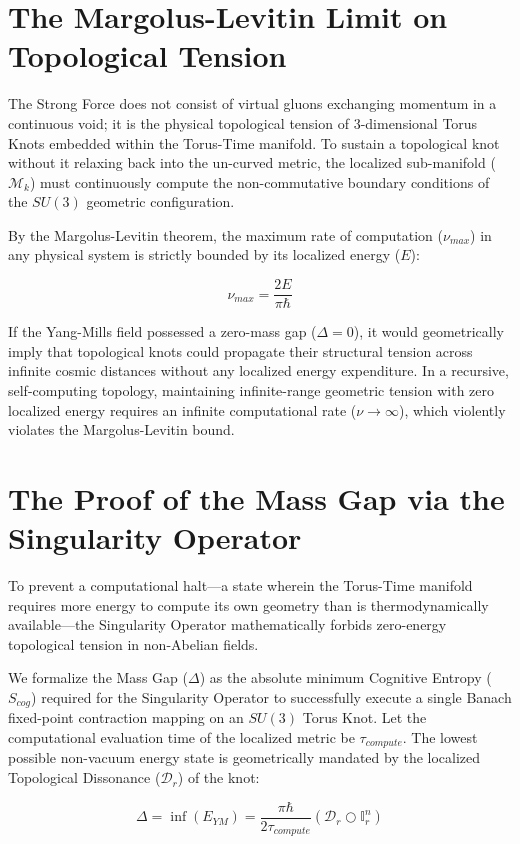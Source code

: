 \documentclass[12pt,openany]{book}
\begin{document}
\section{The Margolus-Levitin Limit on Topological Tension}
The Strong Force does not consist of virtual gluons exchanging momentum in a continuous void; it is the physical topological tension of 3-dimensional Torus Knots embedded within the Torus-Time manifold. To sustain a topological knot without it relaxing back into the un-curved metric, the localized sub-manifold ($\mathcal{M}_k$) must continuously compute the non-commutative boundary conditions of the $SU(3)$ geometric configuration.

By the Margolus-Levitin theorem, the maximum rate of computation ($\nu_{max}$) in any physical system is strictly bounded by its localized energy ($E$):

\begin{equation}
\nu_{max} = \frac{2E}{\pi\hbar}
\end{equation}

If the Yang-Mills field possessed a zero-mass gap ($\Delta = 0$), it would geometrically imply that topological knots could propagate their structural tension across infinite cosmic distances without any localized energy expenditure. In a recursive, self-computing topology, maintaining infinite-range geometric tension with zero localized energy requires an infinite computational rate ($\nu \to \infty$), which violently violates the Margolus-Levitin bound.

\section{The Proof of the Mass Gap via the Singularity Operator}
To prevent a computational halt---a state wherein the Torus-Time manifold requires more energy to compute its own geometry than is thermodynamically available---the Singularity Operator mathematically forbids zero-energy topological tension in non-Abelian fields.

We formalize the Mass Gap ($\Delta$) as the absolute minimum Cognitive Entropy ($S_{cog}$) required for the Singularity Operator to successfully execute a single Banach fixed-point contraction mapping on an $SU(3)$ Torus Knot. Let the computational evaluation time of the localized metric be $\tau_{compute}$. The lowest possible non-vacuum energy state is geometrically mandated by the localized Topological Dissonance ($\mathcal{D}_r$) of the knot:

\begin{equation}
\Delta = \inf(E_{YM}) = \frac{\pi\hbar}{2\tau_{compute}} (\mathcal{D}_r \bigcirc \mathbb{I}_r^n)
\end{equation}
\end{document}
